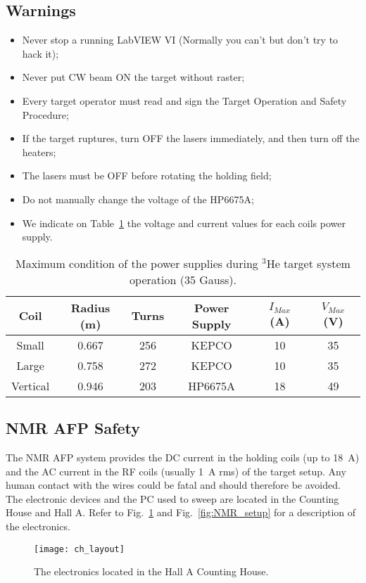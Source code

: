 {\subsection{Warnings}
\begin{itemize}
\item Never stop a running LabVIEW VI (Normally you can't but don't try
  to hack it);
\item Never put CW beam ON the target without raster;
\item Every target operator must read and sign the Target Operation 
  and Safety Procedure;
\item If the target ruptures, turn OFF the lasers immediately, and
then turn off the heaters;
\item The lasers must be OFF before rotating the holding field;
\item Do not manually change the voltage of the HP6675A;
\item We indicate on Table~\ref{tab:coil_ps} the voltage and current 
  values for each coils power supply.
\end{itemize}

\begin{table}
  \begin{center}
    \begin{tabular}{|c|c|c|c|c|c|}
      \hline
      Coil & Radius (m) & Turns & Power Supply & $I_{Max}$ (A)
      & $V_{Max}$ (V) \\
      \hline
      Small & 0.667 & 256 & KEPCO & 10 & 35 \\
      \hline
      Large & 0.758 & 272 & KEPCO & 10 & 35 \\
      \hline
      Vertical & 0.946 & 203 & HP6675A & 18 & 49 \\
      \hline
    \end{tabular}
    \caption{Maximum condition of the power supplies during $^3$He
      target system operation (35 Gauss).}
    \label{tab:coil_ps}
  \end{center}
\end{table}

\subsection{NMR AFP Safety}
The NMR AFP system provides the DC current in the holding coils (up to
18~A) and the AC current in the RF coils (usually 1~A rms) of the
target setup.
Any human contact with the wires could be fatal and should therefore
be avoided. 
The electronic devices and the PC used to sweep are located in the 
Counting House and Hall A. Refer to Fig.~\ref{fig:ch_layout} and 
Fig.~\ref{fig:NMR_setup} for a description of the electronics.
\begin{figure}
  \begin{center}
    \texttt{[image: ch\_layout]}
    \caption{The electronics located in the Hall A Counting House.}
    \label{fig:ch_layout}
  \end{center}
\end{figure}

}

